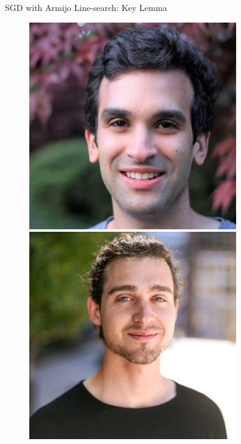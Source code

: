 \documentclass[mathserif,notheorems, hyperref={colorlinks, citecolor=blue, urlcolor=blue, linkcolor=blue}]{beamer}
\begin{document}
\begin{frame}{SGD with Armijo Line-search: Key Lemma}
\begin{minipage}[t]{0.15\textwidth}
\begin{figure}[t]
			\vspace{0.4ex}
			\includegraphics[width=0.8\textwidth]{collaborators/issam}

			\vspace{0.4ex}
			\includegraphics[width=0.8\textwidth]{collaborators/gauthier}


\end{figure}
\end{minipage}
\end{frame}
\end{document}
